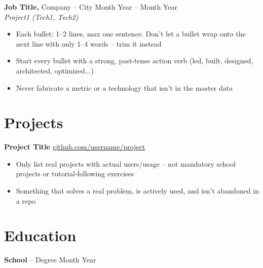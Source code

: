 \documentclass[11pt]{article}       %
\begin{document}
\textbf{Job Title,} {Company} -- City \hfill Month Year -- Month Year \\
\textit{Project1 (Tech1, Tech2)} \\
\vspace{-9pt}
\begin{itemize}
  \item Each bullet: 1--2 lines, max one sentence. Don't let a bullet wrap onto the next line with only 1--4 words -- trim it instead
  \item Start every bullet with a strong, past-tense action verb (led, built, designed, architected, optimized...)
  \item Never fabricate a metric or a technology that isn't in the master data
\end{itemize}

\vspace{-18.5pt}

\section*{Projects}
\textbf{Project Title} \hfill \href{https://github.com/username/project}{github.com/username/project} \\
\vspace{-9pt}
\begin{itemize}
  \item Only list real projects with actual users/usage -- not mandatory school projects or tutorial-following exercises
  \item Something that solves a real problem, is actively used, and isn't abandoned in a repo
\end{itemize}

\vspace{-18.5pt}

\section*{Education}
\textbf{School} -- Degree \hfill Month Year
\end{document}
